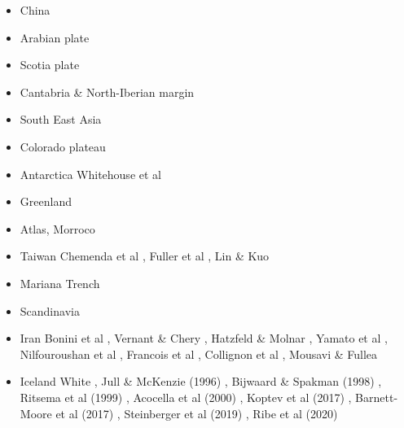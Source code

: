 \begin{itemize}
\item China 
{\scriptsize
\cite{zhst10}
\cite{wazh15}
\cite{guyr16}
\cite{dawl20}
}
\item Arabian plate 
{\scriptsize
\cite{rerl15}
}
\item Scotia plate 
{\scriptsize
\cite{necb13}
\cite{vaga20}
}
\item Cantabria \& North-Iberian margin 
{\scriptsize
\cite{clbb02}
\cite{peap15}
}
\item South East Asia 
{\scriptsize
\cite{rekv04}
\cite{yotr15}\cite{hasp15}\cite{meds15}
\cite{necg16}
}
\item Colorado plateau 
{\scriptsize
\cite{vabv10}
\cite{lesm11}
}
\item Antarctica  
{\scriptsize
\cite{huha07}
Whitehouse et al \cite{whbl12}
}
\item Greenland  
{\scriptsize
\cite{stsj15}\cite{heps15}\cite{stbl19}
}
\item Atlas, Morroco  
{\scriptsize
\cite{mica12}
\cite{kava14}
}
\item Taiwan  
{\scriptsize
Chemenda et al \cite{chys01}, Fuller et al \cite{fuwf06}, Lin \& Kuo \cite{liku16}
}
\item Mariana Trench  
{\scriptsize
\cite{zhlb15}
}
\item Scandinavia  
{\scriptsize
\cite{ramb80}
\cite{bovc14}
}
\item Iran
{\scriptsize
Bonini et al \cite{bocs03},
Vernant \&  Chery \cite{vech06},
Hatzfeld \& Molnar \cite{hamo10},
Yamato et al \cite{yakm11},
Nilfouroushan et al \cite{nipc13},
Francois et al \cite{frba14},
Collignon et al \cite{coyc16},
Mousavi \& Fullea \cite{mofu20}
} 

\item Iceland
{\scriptsize
White \cite{whit89},
Jull \& McKenzie (1996) \cite{jumc96},
Bijwaard \& Spakman  (1998) \cite{bisp98},
Ritsema et al (1999) \cite{rivw99},
Acocella et al  (2000) \cite{acgf00},
Koptev et al (2017) \cite{kocb17},
Barnett-Moore et al (2017) \cite{bahf17},
Steinberger et al (2019) \cite{stbl19},
Ribe et al (2020) \cite{rits20}
} 



\end{itemize}
